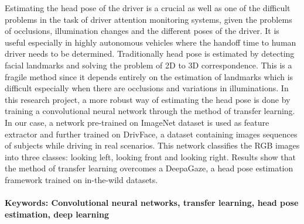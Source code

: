 \documentclass[a4paper, 12pt, oneside, BCOR1cm,toc=chapterentrywithdots]{scrbook}
\renewcommand*{\tableofcontents}{%
  	\begingroup
  	\tocsection
  	\tocfile{\contentsname}{toc}
  	\endgroup
}
\renewcommand*{\listoffigures}{%
  	\begingroup
  	\tocsection
  	\tocfile{\listfigurename}{lof}
  	\endgroup
}
\renewcommand{\listoftables}{
	\begingroup
	\tocsection
	\tocfile{\listtablename}{lot}
	\endgroup
}
\begin{document}

Estimating the head pose of the driver is a crucial as well as one of the difficult problems in the task of driver attention monitoring systems, given the problems of occlusions, illumination changes and the different poses of the driver. It is useful especially in highly autonomous vehicles where the handoff time to human driver needs to be determined. Traditionally head pose is estimated by detecting facial landmarks and solving the problem of 2D to 3D correspondence. This is a fragile method since it depends entirely on the estimation of landmarks which is difficult especially when there are occlusions and variations in illuminations. In this research project, a more robust way of estimating the head pose is done by training a convolutional neural network through the method of transfer learning. In our case, a network pre-trained on ImageNet dataset is used as feature extractor and further trained on DrivFace, a dataset containing images sequences of subjects while driving in real scenarios. This network classifies the RGB images into three classes: looking left, looking front and looking right. Results show that the method of transfer learning overcomes a DeepaGaze, a head pose estimation framework trained on in-the-wild datasets.
\\\\
\textbf{Keywords: Convolutional neural networks, transfer learning, head pose estimation, deep learning}


\tableofcontents
\listoffigures
\listoftables

\twocolumn
{}
\begin{acronym}[Bash]
\end{acronym}
\end{document}
